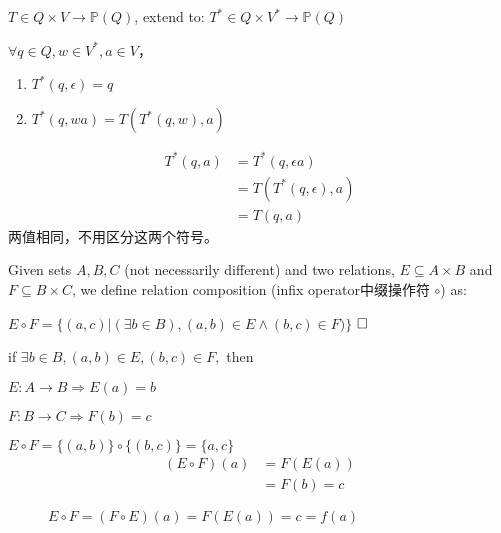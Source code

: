 \begin{note}
	$T\in Q\times V\to \mathbb{P}(Q)$,	extend to: $T^\ast \in Q\times V^\ast \to \mathbb{P}(Q)$
	
	$\forall q\in Q, w\in V^{\ast}, a\in V$，
	\begin{enumerate}
		\item $T^\ast(q,\epsilon) = q$
		\item $T^\ast(q,wa) = T(T^\ast(q,w),a)$
	\end{enumerate}
	\begin{align*}
	T^\ast(q,a) &= T^\ast(q,\epsilon a) \\
	&= T(T^\ast(q,\epsilon),a) \\
	&= T(q,a)
	\end{align*}
	两值相同，不用区分这两个符号。
\end{note}

\begin{convention}\label{con:comp} Given sets $A,B,C$ (not necessarily different) and two relations, $E\subseteq A\times B$ and $F\subseteq B\times C$, we define relation composition (infix operator中缀操作符 $\circ$) as:

$E\circ F = \{(a,c)|(\exists b\in B),(a,b)\in E\land (b,c)\in F)\}$  $\hfill\square$
\end{convention}

\begin{note} if $\exists b\in B,(a,b)\in E,(b,c)\in F,$ then
	
	$E:A\to B\Rightarrow E(a)=b$
	
	$F:B\to C\Rightarrow F(b)=c$
	
	$E\circ F =\{(a,b)\}\circ \{(b,c)\}=\{a,c\}$
	\begin{align*}
	(E\circ F)(a) &=F(E(a)) \\
	&=F(b) = c
	\end{align*}
	\begin{figure}[hbtp]
		\caption{$E\circ F= (F\circ E)(a)=F(E(a)) = {c} =f(a)$}
	\end{figure}
\end{note}

